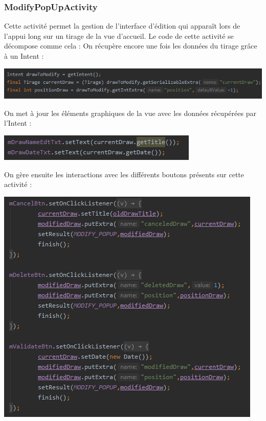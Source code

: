\documentclass{article}
\begin{document}
\subsubsection{ModifyPopUpActivity}
\noindent Cette activité permet la gestion de l'interface d'édition qui apparaît lors de l'appui long sur un tirage de la vue d'accueil.
\newline Le code de cette activité se décompose comme cela :
\vspace{1em}
\newline On récupère encore une fois les données du tirage grâce à un Intent :
\vspace{1em}
\newline
\begin{center} \includegraphics[]{intent_popUpAct.png} \end{center}
\vspace{1em}
On met à jour les éléments graphiques de la vue avec les données récupérées par l'Intent :
\newline
\begin{center} \includegraphics[]{maj_popUpAct.png} \end{center}
\vspace{1em}
On gère ensuite les interactions avec les différents boutons présents sur cette activité :
\vspace{1em}
\newline
\begin{center} \includegraphics[]{interactions_popUpAct.png} \end{center}
\end{document}

